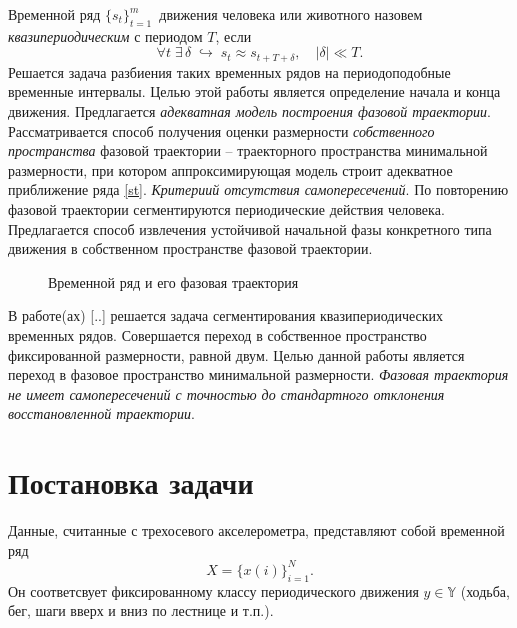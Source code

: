 \documentclass[12pt, twoside]{article}
\begin{document}
Временной ряд $\{s_t\}_{t=1}^m$\, движения человека или животного назовем \emph{квазипериодическим} с периодом $T$, если 
    \begin{equation}\label{st}
       \forall t\;\exists \, \delta\mspace{5mu} \hookrightarrow\mspace{5mu} s_{t} \approx s_{t + T + \delta}, \quad |\delta| \ll T. 
    \end{equation}
Решается задача разбиения таких временных рядов на периодоподобные временные интервалы. Целью этой работы является определение начала и конца движения. Предлагается \emph{адекватная модель построения фазовой траектории}. Рассматривается способ получения оценки размерности \emph{собственного пространства} фазовой траектории -- траекторного пространства минимальной размерности, при котором аппроксимирующая модель строит адекватное приближение ряда \eqref{st}. \emph{Критериий отсутствия самопересечений}. По повторению фазовой траектории сегментируются периодические действия человека. Предлагается способ извлечения устойчивой начальной фазы конкретного типа движения в собственном пространстве фазовой траектории.

    \begin{figure}[ht]
        \caption{Временной ряд и его фазовая траектория}
    \end{figure}

В работе(ах) \cite{motrenko2015extracting} [..] решается задача сегментирования квазипериодических временных рядов. Совершается переход в собственное пространство фиксированной размерности, равной двум. Целью данной работы является переход в фазовое пространство минимальной размерности. \emph{Фазовая траектория не имеет самопересечений с точностью до стандартного отклонения восстановленной траектории}.

\section{Постановка задачи}
Данные, считанные с трехосевого акселерометра, представляют собой временной ряд 
    \begin{equation}\label{ts}
        X = \{ x(i) \}_{i = 1}^{N}.
    \end{equation}  
Он соответсвует фиксированному классу периодического движения $y\in\mathbb{Y}$ (ходьба, бег, шаги вверх и вниз по лестнице и т.п.).
\end{document}
